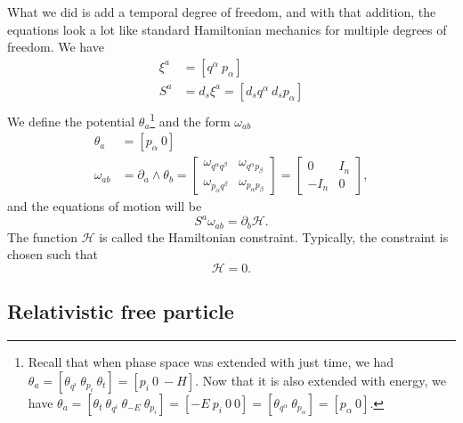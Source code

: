 What we did is add a temporal degree of freedom, and with that addition, the equations look a lot like standard Hamiltonian mechanics for multiple degrees of freedom. We have
\begin{equation}
	\begin{aligned}
		\xi^a &= [q^\alpha \ p_\alpha ] \\
		S^a &= d_s \xi^a = [d_s q^\alpha \ d_s p_\alpha] \\
	\end{aligned}
\end{equation}
We define the potential $\theta_a$\footnote{Recall that when phase space was extended with just time, we had $\theta_a = [\theta_{q^i} \ \theta_{p_i} \ \theta_t] = [p_i \ 0 \ -H]$. Now that it is also extended with energy, we have $\theta_a = [\theta_t \ \theta_{q^i} \ \theta_{-E} \ \theta_{p_i} ] = [-E \ p_i \ 0 \ 0] = [\theta_{q^\alpha} \ \theta_{p_\alpha} ] = [p_\alpha \ 0]$. } and the form $\omega_{ab}$
\begin{equation}\label{rp-cm-rel-symplecticForm}
	\tag{SF-FEPS}
	\begin{aligned}
		\theta_a &= [p_\alpha \ 0] \\
	\omega_{ab} &= \partial_a \wedge \theta_b = \left[\begin{array}{cc}
		\omega_{q^\alpha q^\beta} & \omega_{q^\alpha p_\beta} \\
		\omega_{p_\alpha q^\beta} & \omega_{p_\alpha p_\beta} 
	\end{array} \right]= \left[\begin{array}{cc}
		0 & I_n \\
		- I_n & 0 
	\end{array} \right],
	\end{aligned}
\end{equation}
and the equations of motion will be
\begin{equation}
	S^a \omega_{ab} = \partial_b \mathcal{H}.
\end{equation}
The function $\mathcal{H}$ is called the Hamiltonian constraint. Typically, the constraint is chosen such that
\begin{equation}
	\mathcal{H}=0.
\end{equation}

\subsection{Relativistic free particle}

